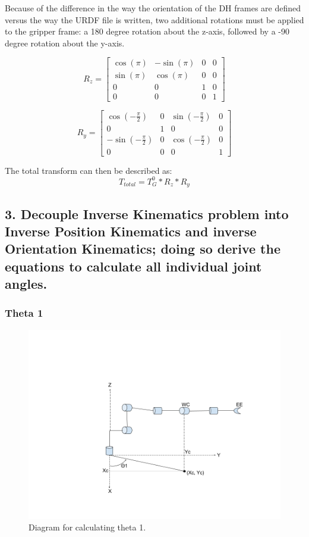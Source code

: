 \documentclass{article}
\begin{document}
Because of the difference in the way the orientation of the DH frames are defined versus the way the URDF file is written, two additional rotations must be applied to the gripper frame: a 180 degree rotation about the z-axis, followed by a -90 degree rotation about the y-axis.

\[R_z = 
\begin{bmatrix}
    \cos(\pi) & -\sin(\pi) & 0 & 0 \\
    \sin(\pi) & \cos(\pi) & 0 & 0 \\
    0 & 0 & 1 & 0 \\
    0 & 0 & 0 & 1
\end{bmatrix}
\]

\[R_y = 
\begin{bmatrix}
    \cos(-\frac{\pi}{2}) & 0 & \sin(-\frac{\pi}{2}) & 0 \\
    0 & 1 & 0 & 0 \\
    -\sin(-\frac{\pi}{2}) & 0 & \cos(-\frac{\pi}{2}) & 0 \\
   0 & 0 & 0 & 1
\end{bmatrix}
\]

The total transform can then be described as:
\[T_{total} = T_G^0 * R_z * R_y \]


\subsection{3. Decouple Inverse Kinematics problem into Inverse Position Kinematics and inverse Orientation Kinematics; doing so derive the equations to calculate all individual joint angles.}

\subsubsection{Theta 1}
\begin{figure}[H]
    \includegraphics[width=\linewidth]{theta1.png}
    \caption{Diagram for calculating theta 1.}
    \label{fig:theta3}
\end{figure}
\end{document}
